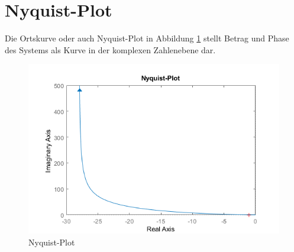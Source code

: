 \section{Nyquist-Plot}

Die Ortskurve oder auch Nyquist-Plot in Abbildung \ref{fig:nyquist-plot} stellt Betrag und Phase des Systems als Kurve in der komplexen Zahlenebene dar.

\begin{figure}[H]
	\centering
	\includegraphics[width=0.7\linewidth]{diagrams/nyquistDiagram.png}
	\caption[Nyquist-Plot]{Nyquist-Plot}
	\label{fig:nyquist-plot}
\end{figure}